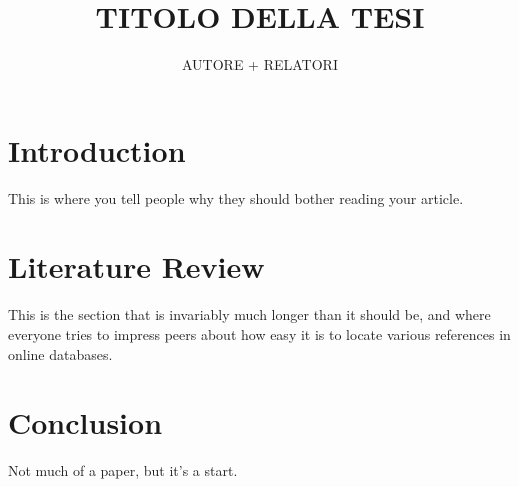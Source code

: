 \documentclass{article}
\title{TITOLO DELLA TESI}
\author{AUTORE + RELATORI}
\begin{document}
\maketitle
\newpage

\section*{Introduction}
This is where you tell people why they should bother reading your article.

\section*{Literature Review}
This is the section that is invariably much longer than it should be, and
where everyone tries to impress peers about how easy it is to locate various
references in online databases.

\section*{Conclusion}
Not much of a paper, but it's a start.
\end{document}
